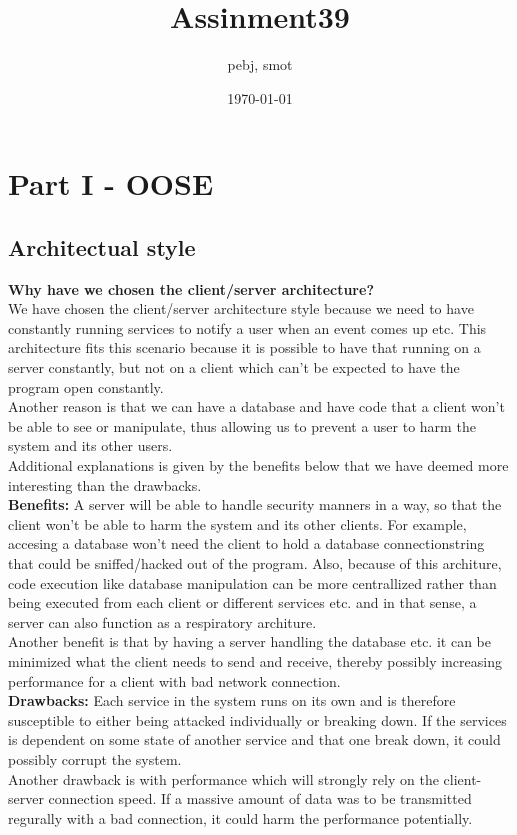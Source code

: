 \documentclass[a4paper]{article}
\title{Assinment39}
\author{pebj, smot}
\date{\today}
\begin{document}
\maketitle

\section{Part I - OOSE}
\subsection{Architectual style}
\label{sec:style}

\textbf{Why have we chosen the client/server architecture?}\\
We have chosen the client/server architecture style because we need to have constantly running services to notify a user when an event comes up etc. This architecture fits this scenario because it is possible to have that running on a server constantly, but not on a client which can't be expected to have the program open constantly.\\
Another reason is that we can have a database and have code that a client won't be able to see or manipulate, thus allowing us to prevent a user to harm the system and its other users. \\
Additional explanations is given by the benefits below that we have deemed more interesting than the drawbacks.\\

\textbf{Benefits:}
A server will be able to handle security manners in a way, so that the client won't be able to harm the system and its other clients. For example, accesing a
database won't need the client to hold a database connectionstring that could be sniffed/hacked out of the program. Also, because of
this architure, code execution like database manipulation can be more centrallized rather than being executed from each client or different services etc. and in that sense, a server can also function as a respiratory architure.\\
Another benefit is that by having a server handling the database etc. it can be minimized what the client needs to send and receive, thereby possibly increasing performance for a client with bad network connection.\\

\textbf{Drawbacks:}
Each service in the system runs on its own and is therefore susceptible to either being attacked individually or breaking down.
If the services is dependent on some state of another service and that one break down, it could possibly corrupt the system.\\
Another drawback is with performance which will strongly rely on the client-server connection speed. If a massive amount of data was
to be transmitted regurally with a bad connection, it could harm the performance potentially.\\
\end{document}
